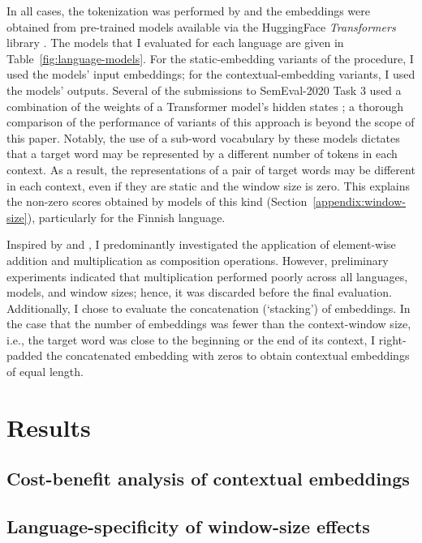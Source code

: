 In all cases, the tokenization was performed by and the embeddings were obtained from
pre-trained models available via the HuggingFace \emph{Transformers} library
\parencite{Wolf2020}.
The models that I evaluated for each language are given in Table~\ref{fig:language-models}.
For the static-embedding variants of the procedure, I used the models' input embeddings;
for the contextual-embedding variants, I used the models' outputs.
Several of the submissions to SemEval-2020 Task 3 used a combination of the weights of a
Transformer model's hidden states \parencites[e.g.,][276]{Gamallo2020}[3]{Pessutto2020}[4]{Hettiarachchi2021}; a thorough comparison of the performance of variants
of this approach is beyond the scope of this paper.
Notably, the use of a sub-word vocabulary by these models
\parencite[e.g.,][4174]{Devlin2019} dictates that a target word may be represented by a
different number of tokens in each context.
As a result, the representations of a pair of target words may be different in each
context, even if they are static and the window size is zero.
This explains the non-zero scores obtained by models of this kind
(Section~\ref{appendix:window-size}), particularly for the Finnish language.

Inspired by \textcite{Kintsch2001} and \textcite{Mitchell2008}, I predominantly
investigated the application of element-wise addition and multiplication as composition
operations.
However, preliminary experiments indicated that multiplication performed poorly across
all languages, models, and window sizes; hence, it was discarded before the final
evaluation.
Additionally, I chose to evaluate the concatenation (`stacking') of embeddings.
In the case that the number of embeddings was fewer than the context-window size, i.e.,
the target word was close to the beginning or the end of its context, I right-padded the
concatenated embedding with zeros to obtain contextual embeddings of equal length.

\section{Results}

\subsection{Cost-benefit analysis of contextual embeddings}
\label{sec:cost-benefit}

\subsection{Language-specificity of window-size effects}

